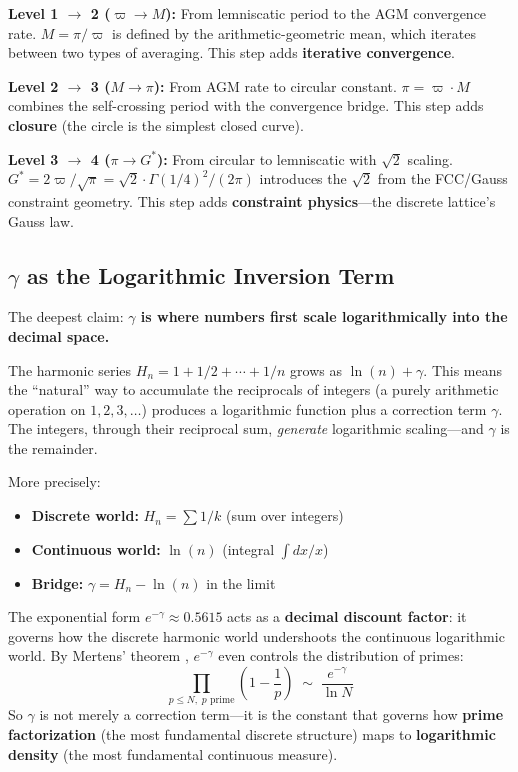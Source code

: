 \documentclass[11pt, letterpaper]{article}
\newcommand{\G}{G^*}
\theoremstyle{definition}
\theoremstyle{remark}
\begin{document}
\textbf{Level 1 $\to$ 2 ($\varpi \to M$):} From lemniscatic period to the AGM convergence rate. $M = \pi/\varpi$ is defined by the arithmetic-geometric mean, which iterates between two types of averaging. This step adds \textbf{iterative convergence}.

\textbf{Level 2 $\to$ 3 ($M \to \pi$):} From AGM rate to circular constant. $\pi = \varpi \cdot M$ combines the self-crossing period with the convergence bridge. This step adds \textbf{closure} (the circle is the simplest closed curve).

\textbf{Level 3 $\to$ 4 ($\pi \to \G$):} From circular to lemniscatic with $\sqrt{2}$ scaling. $\G = 2\varpi/\sqrt{\pi} = \sqrt{2} \cdot \Gamma(1/4)^2/(2\pi)$ introduces the $\sqrt{2}$ from the FCC/Gauss constraint geometry. This step adds \textbf{constraint physics}---the discrete lattice's Gauss law.

\subsection{$\gamma$ as the Logarithmic Inversion Term}

The deepest claim: \textbf{$\gamma$ is where numbers first scale logarithmically into the decimal space.}

The harmonic series $H_n = 1 + 1/2 + \cdots + 1/n$ grows as $\ln(n) + \gamma$. This means the ``natural'' way to accumulate the reciprocals of integers (a purely arithmetic operation on $1, 2, 3, \ldots$) produces a logarithmic function plus a correction term $\gamma$. The integers, through their reciprocal sum, \textit{generate} logarithmic scaling---and $\gamma$ is the remainder.

More precisely:
\begin{itemize}[noitemsep]
    \item \textbf{Discrete world:} $H_n = \sum 1/k$ (sum over integers)
    \item \textbf{Continuous world:} $\ln(n)$ (integral $\int dx/x$)
    \item \textbf{Bridge:} $\gamma = H_n - \ln(n)$ in the limit
\end{itemize}

The exponential form $e^{-\gamma} \approx 0.5615$ acts as a \textbf{decimal discount factor}: it governs how the discrete harmonic world undershoots the continuous logarithmic world. By Mertens' theorem \cite{Mertens1874}, $e^{-\gamma}$ even controls the distribution of primes:
\begin{equation}
    \prod_{p \leq N,\; p\text{ prime}} \left(1 - \frac{1}{p}\right) \;\sim\; \frac{e^{-\gamma}}{\ln N}
\end{equation}
So $\gamma$ is not merely a correction term---it is the constant that governs how \textbf{prime factorization} (the most fundamental discrete structure) maps to \textbf{logarithmic density} (the most fundamental continuous measure).
\end{document}
